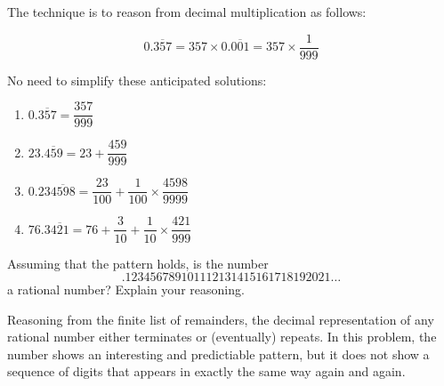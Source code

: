 \begin{teachingnote}
The technique is to reason from decimal multiplication as follows:  

$$0.\overline{357} = 357\times  0.\overline{001} = 357 \times \frac{1}{999}$$

No need to simplify these anticipated solutions: 
\begin{enumerate}
\item $0.\overline{357} = \dfrac{357}{999}$
\item $23.\overline{459} = 23 + \dfrac{459}{999}$
\item $0.23\overline{4598} = \dfrac{23}{100}+ \dfrac{1}{100}\times\dfrac{4598}{9999}$
\item $76.3\overline{421} = 76 + \dfrac{3}{10}+ \dfrac{1}{10}\times\dfrac{421}{999}$
\end{enumerate}
\end{teachingnote}

\begin{prob} 
Assuming that the pattern holds, is the number
\[
.123456789101112131415161718192021\dots
\]
a rational number? Explain your reasoning.
\end{prob}

\begin{teachingnote}
Reasoning from the finite list of remainders, the decimal representation of any rational number either terminates or (eventually) repeats.  In this problem, the number shows an interesting and predictiable pattern, but it does not show a sequence of digits that appears in exactly the same way again and again.  
\end{teachingnote}
